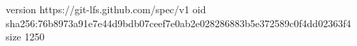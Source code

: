 version https://git-lfs.github.com/spec/v1
oid sha256:76b8973a91e7e44d9bdb07ceef7e0ab2e028286883b5e372589c0f4dd02363f4
size 1250
